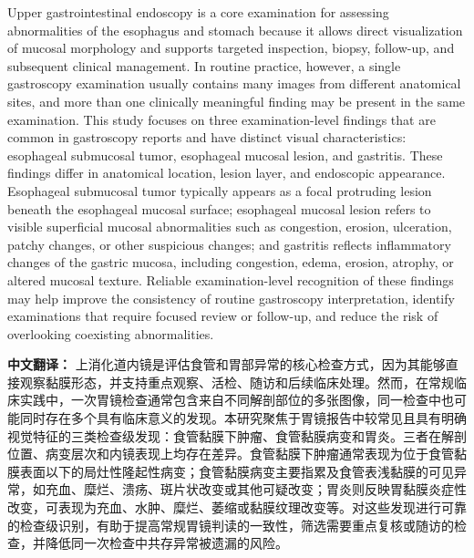 \documentclass[Afour,sagev,times]{sagej}
\begin{document}
Upper gastrointestinal endoscopy is a core examination for assessing abnormalities of the esophagus and stomach because it allows direct visualization of mucosal morphology and supports targeted inspection, biopsy, follow-up, and subsequent clinical management. In routine practice, however, a single gastroscopy examination usually contains many images from different anatomical sites, and more than one clinically meaningful finding may be present in the same examination. This study focuses on three examination-level findings that are common in gastroscopy reports and have distinct visual characteristics: esophageal submucosal tumor, esophageal mucosal lesion, and gastritis. These findings differ in anatomical location, lesion layer, and endoscopic appearance. Esophageal submucosal tumor typically appears as a focal protruding lesion beneath the esophageal mucosal surface; esophageal mucosal lesion refers to visible superficial mucosal abnormalities such as congestion, erosion, ulceration, patchy changes, or other suspicious changes; and gastritis reflects inflammatory changes of the gastric mucosa, including congestion, edema, erosion, atrophy, or altered mucosal texture. Reliable examination-level recognition of these findings may help improve the consistency of routine gastroscopy interpretation, identify examinations that require focused review or follow-up, and reduce the risk of overlooking coexisting abnormalities.

\textbf{中文翻译：} 上消化道内镜是评估食管和胃部异常的核心检查方式，因为其能够直接观察黏膜形态，并支持重点观察、活检、随访和后续临床处理。然而，在常规临床实践中，一次胃镜检查通常包含来自不同解剖部位的多张图像，同一检查中也可能同时存在多个具有临床意义的发现。本研究聚焦于胃镜报告中较常见且具有明确视觉特征的三类检查级发现：食管黏膜下肿瘤、食管黏膜病变和胃炎。三者在解剖位置、病变层次和内镜表现上均存在差异。食管黏膜下肿瘤通常表现为位于食管黏膜表面以下的局灶性隆起性病变；食管黏膜病变主要指累及食管表浅黏膜的可见异常，如充血、糜烂、溃疡、斑片状改变或其他可疑改变；胃炎则反映胃黏膜炎症性改变，可表现为充血、水肿、糜烂、萎缩或黏膜纹理改变等。对这些发现进行可靠的检查级识别，有助于提高常规胃镜判读的一致性，筛选需要重点复核或随访的检查，并降低同一次检查中共存异常被遗漏的风险。
\end{document}
